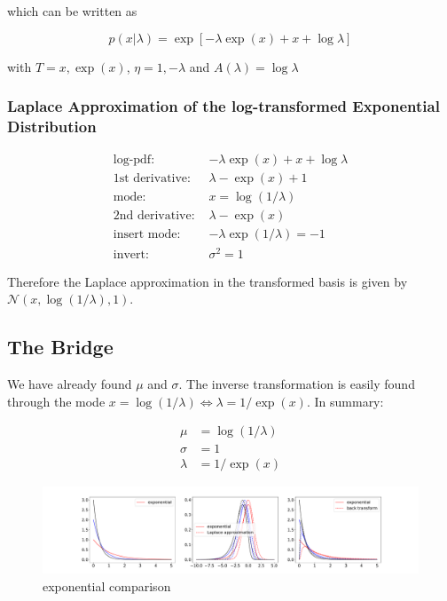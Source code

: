 which can be written as 


\begin{equation}
	p(x|\lambda) = \exp\left[-\lambda \exp(x) + x + \log\lambda\right]
	\label{eq:exponential_exp_family_trans}
\end{equation}

with $T= x, \exp(x)$, $\eta = 1, -\lambda$ and $A(\lambda)=\log\lambda$

\subsubsection{Laplace Approximation of the log-transformed Exponential Distribution}

\begin{align*}
\text{log-pdf: } & -\lambda \exp(x) + x + \log\lambda \\
\text{1st derivative: }& \lambda -\exp(x) + 1 \\
\text{mode: } & x = \log(1/\lambda) \\
\text{2nd derivative: }& \lambda -\exp(x)\\
\text{insert mode: }& -\lambda\exp(1/\lambda) = -1\\
\text{invert: }&\sigma^2 = 1
\end{align*}

Therefore the Laplace approximation in the transformed basis is given by $\mathcal{N}(x, \log(1/\lambda), 1)$. 

\subsection{The Bridge}

We have already found $\mu$ and $\sigma$. The inverse transformation is easily found through the mode $x = \log(1/\lambda) \Leftrightarrow \lambda = 1/\exp(x)$. In summary:

\begin{align}
	\mu &= \log(1/\lambda) \\
	\sigma &= 1 \\
	\lambda &= 1/\exp(x)
\end{align}

\begin{figure}
	\centering
	\includegraphics[width=\textwidth]{figures/exponential_playground.pdf}
	\caption{exponential comparison}
	\label{fig:exponential_comparison}
\end{figure}